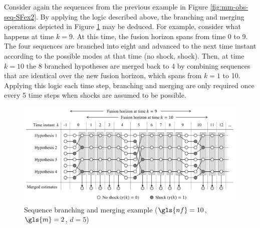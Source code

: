 Consider again the sequences from the previous example in Figure \ref{fig:mm-obs-seq-SFex2}. By applying the logic described above, the branching and merging operations depicted in Figure \ref{fig:mm-obs-seq-sf95} may be deduced. For example, consider what happens at time $k=9$. At this time, the fusion horizon spans from time 0 to 9. The four sequences are branched into eight and advanced to the next time instant according to the possible modes at that time (no shock, shock). Then, at time $k=10$ the 8 branched hypotheses are merged back to 4 by combining sequences that are identical over the new fusion horizon, which spans from $k=1$ to 10. Applying this logic each time step, branching and merging are only required once every 5 time steps when shocks are assumed to be possible.
\begin{figure}[ht]
	\centering
	\includegraphics[width=15.5cm]{images/mm_obs_seq_sf95.pdf}
	\caption{Sequence branching and merging example ($\gls{nf}=10$, $\gls{m}=2$, $d=5$)}
	\label{fig:mm-obs-seq-sf95}
\end{figure}

